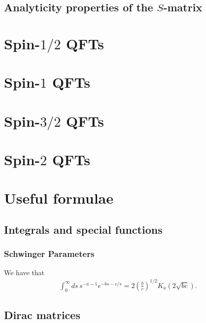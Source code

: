 \documentclass[11pt]{article}
\begin{document}
\subsection{Analyticity properties of the $S$-matrix}



\section{Spin-$1/2$ QFTs}


\section{Spin-$1$ QFTs}


\section{Spin-$3/2$ QFTs}


\section{Spin-$2$ QFTs}



\section{Useful formulae}

\subsection{Integrals and special functions}


\subsubsection{Schwinger Parameters}

We have that
\begin{align*}
    \int_0^\infty ds \, s^{- a - 1} e^{-bs - c/s} = 2 \left( \frac{b}{c} \right)^{1/2} K_a(2 \sqrt{bc}).
\end{align*}

\subsection{Dirac matrices}
\end{document}
